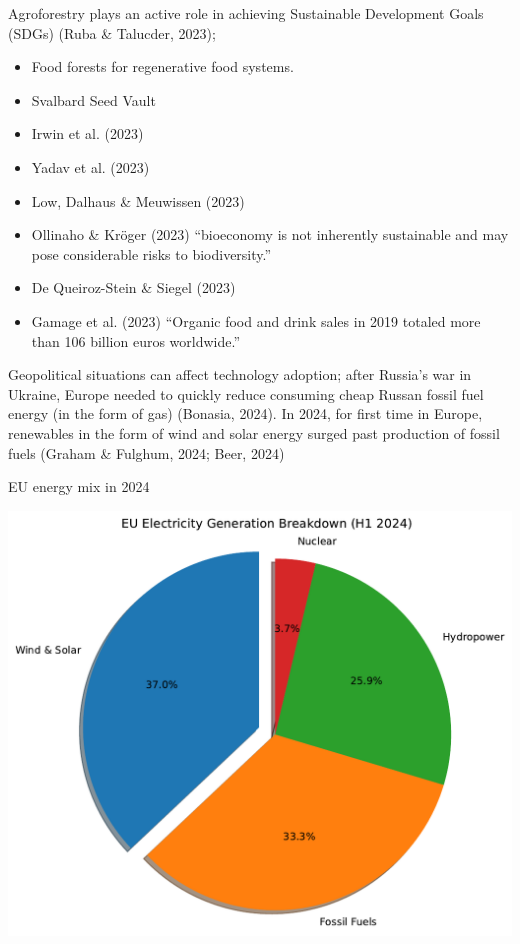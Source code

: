 \documentclass[
  letterpaper,
  DIV=11,
  numbers=noendperiod]{scrartcl}
\providecommand{\tightlist}{%
  \setlength{\itemsep}{0pt}\setlength{\parskip}{0pt}}\usepackage{longtable,booktabs,array}
\begin{document}
Agroforestry plays an active role in achieving Sustainable Development
Goals (SDGs) (Ruba \& Talucder, 2023);

\begin{itemize}
\tightlist
\item
  Food forests for regenerative food systems.
\item
  Svalbard Seed Vault
\item
  Irwin et al. (2023)
\item
  Yadav et al. (2023)
\item
  Low, Dalhaus \& Meuwissen (2023)
\item
  Ollinaho \& Kröger (2023) ``bioeconomy is not inherently sustainable
  and may pose considerable risks to biodiversity.''
\item
  De Queiroz-Stein \& Siegel (2023)
\item
  Gamage et al. (2023) ``Organic food and drink sales in 2019 totaled
  more than 106 billion euros worldwide.''
\end{itemize}

Geopolitical situations can affect technology adoption; after Russia's
war in Ukraine, Europe needed to quickly reduce consuming cheap Russan
fossil fuel energy (in the form of gas) (Bonasia, 2024). In 2024, for
first time in Europe, renewables in the form of wind and solar energy
surged past production of fossil fuels (Graham \& Fulghum, 2024; Beer,
2024)

EU energy mix in 2024

\includegraphics{_thesis_files/figure-pdf/cell-15-output-1.pdf}
\end{document}
